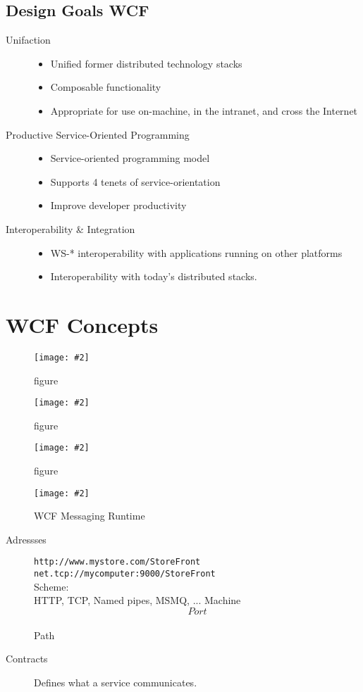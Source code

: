 \documentclass[a4paper,10pt]{scrreprt}
\newcommand{\pic}[2][figure]{\begin{figure}[h]
 \centering
 \texttt{[image: \#2]}
 \caption{#1}
\end{figure}
}
\begin{document}
\subsection{Design Goals WCF}
\begin{description}
 \item [Unifaction] \begin{itemize}
                     \item Unified former distributed technology stacks
\item Composable functionality
\item Appropriate for use on-machine, in the intranet, and
cross the Internet
\end{itemize}
\item[Productive Service-Oriented Programming] \begin{itemize}
                                                \item Service-oriented programming model
\item Supports 4 tenets of service-orientation
\item Improve developer productivity
                                               \end{itemize}
\item[Interoperability \& Integration] \begin{itemize}
                                       \item WS-* interoperability with applications running on other platforms
\item Interoperability with today’s distributed stacks.
                                      \end{itemize}

\end{description}

\section{WCF Concepts}
\pic{cservice.png}
\pic{endp.png}
\pic{abc.png}
\pic[WCF Messaging Runtime]{wcfmr.png}
\begin{description}
 \item [Adressses] \texttt{http://www.mystore.com/StoreFront
net.tcp://mycomputer:9000/StoreFront}\\
Scheme:\\
HTTP, TCP, Named pipes, MSMQ, ...
Machine\\
\[Port\]\\
Path\\
\item[Contracts] Defines what a service communicates.
\end{description}
\end{document}

